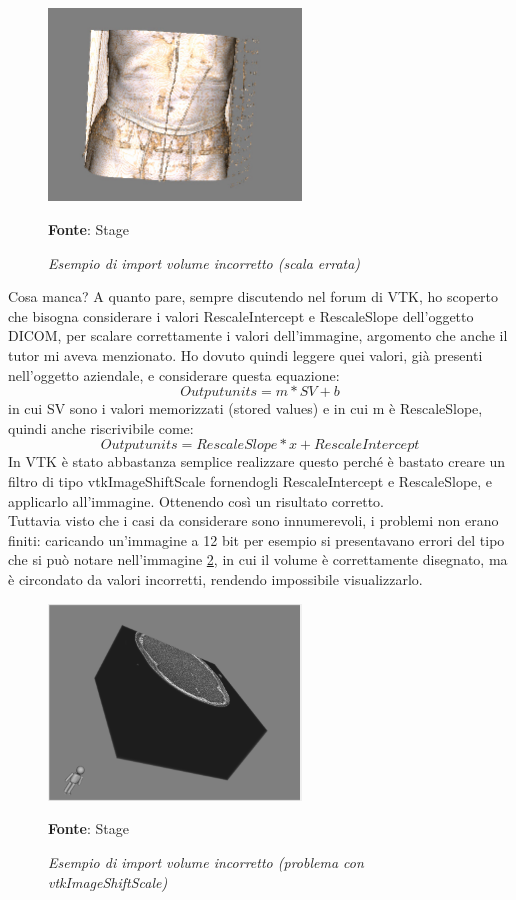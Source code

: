 \begin{figure}[h]
    \centering
    \includegraphics[width=0.6\textwidth]{immagini/svolgimento/volumebrokenscale.jpeg}
    \caption{\textit{Esempio di import volume incorretto (scala errata)}}
    \textbf{Fonte}: Stage
    \label{fig: Volume Wrong Scale}
\end{figure}

Cosa manca? A quanto pare, sempre discutendo nel forum di VTK, ho scoperto che bisogna considerare i valori RescaleIntercept e RescaleSlope dell'oggetto DICOM, per scalare correttamente i valori dell'immagine, argomento che anche il tutor mi aveva menzionato. Ho dovuto quindi leggere quei valori, già presenti nell'oggetto aziendale, e considerare questa equazione:
\[ Output units = m *SV + b \]
in cui SV sono i valori memorizzati (stored values) e in cui m è RescaleSlope, quindi anche riscrivibile come: 
\[ Output units = RescaleSlope * x + RescaleIntercept \]
In VTK è stato abbastanza semplice realizzare questo perché è bastato creare un filtro di tipo vtkImageShiftScale fornendogli RescaleIntercept e RescaleSlope, e applicarlo all'immagine. Ottenendo così un risultato corretto.
\\
Tuttavia visto che i casi da considerare sono innumerevoli, i problemi non erano finiti: caricando un'immagine a 12 bit per esempio si presentavano errori del tipo che si può notare nell'immagine \ref{fig: Volume Wrong Value}, in cui il volume è correttamente disegnato, ma è circondato da valori incorretti, rendendo impossibile visualizzarlo.

\begin{figure}[h]
    \centering
    \includegraphics[width=0.6\textwidth]{immagini/svolgimento/volumebroken12bit.png}
    \caption{\textit{Esempio di import volume incorretto (problema con vtkImageShiftScale)}}
    \textbf{Fonte}: Stage
    \label{fig: Volume Wrong Value}
\end{figure}

